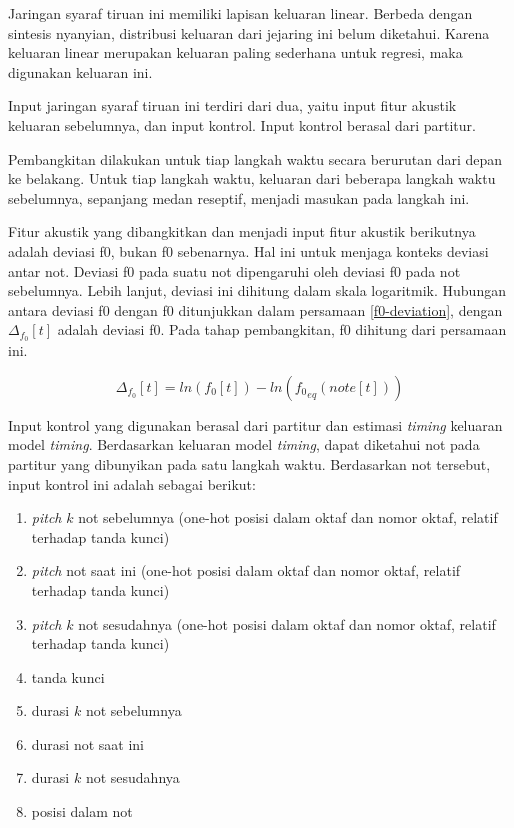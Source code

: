 Jaringan syaraf tiruan ini memiliki lapisan keluaran linear. Berbeda dengan sintesis nyanyian, distribusi keluaran dari jejaring ini belum diketahui. Karena keluaran linear merupakan keluaran paling sederhana untuk regresi, maka digunakan keluaran ini.

Input jaringan syaraf tiruan ini terdiri dari dua, yaitu input fitur akustik keluaran sebelumnya, dan input kontrol. Input kontrol berasal dari partitur.

Pembangkitan dilakukan untuk tiap langkah waktu secara berurutan dari depan ke belakang. Untuk tiap langkah waktu, keluaran dari beberapa langkah waktu sebelumnya, sepanjang medan reseptif, menjadi masukan pada langkah ini.

Fitur akustik yang dibangkitkan dan menjadi input fitur akustik berikutnya adalah deviasi f0, bukan f0 sebenarnya. Hal ini untuk menjaga konteks deviasi antar not. Deviasi f0 pada suatu not dipengaruhi oleh deviasi f0 pada not sebelumnya. Lebih lanjut, deviasi ini dihitung dalam skala logaritmik. Hubungan antara deviasi f0 dengan f0 ditunjukkan dalam persamaan \ref{f0-deviation}, dengan $\Delta_{f_0}[t]$ adalah deviasi f0. Pada tahap pembangkitan, f0 dihitung dari persamaan ini.

\begin{equation}
    \Delta_{f_0}[t] = ln(f_0[t]) - ln({f_0}_{eq}(note[t]))
\end{equation}\label{f0-deviation}

Input kontrol yang digunakan berasal dari partitur dan estimasi \textit{timing} keluaran model \textit{timing}. Berdasarkan keluaran model \textit{timing}, dapat diketahui not pada partitur yang dibunyikan pada satu langkah waktu. Berdasarkan not tersebut, input kontrol ini adalah sebagai berikut:

\begin{enumerate}
    \item \textit{pitch} $k$ not sebelumnya (one-hot posisi dalam oktaf dan nomor oktaf, relatif terhadap tanda kunci)
    \item \textit{pitch} not saat ini (one-hot posisi dalam oktaf dan nomor oktaf, relatif terhadap tanda kunci)
    \item \textit{pitch} $k$ not sesudahnya (one-hot posisi dalam oktaf dan nomor oktaf, relatif terhadap tanda kunci)
    \item tanda kunci
    \item durasi $k$ not sebelumnya
    \item durasi not saat ini
    \item durasi $k$ not sesudahnya
    \item posisi dalam not
\end{enumerate}

